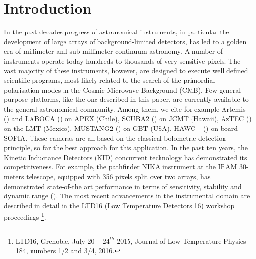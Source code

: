 \documentclass[]{aa} %
\begin{document}

   \maketitle
%

\section{Introduction}

In the past decades progress of astronomical instruments, in particular the development of large arrays of background-limited detectors, has led to a golden era of millimeter and sub-millimeter continuum astronomy. A number of instruments operate today hundreds to thousands of very sensitive pixels. The vast majority of these instruments, however, are designed to execute well defined scientific programs, most likely related to the search of the primordial polarisation modes in the Cosmic Microwave Background (CMB). Few general purpose platforms, like the one described in this paper, are currently available to the general astronomical community. Among them, we cite for example Artemis (\cite{Reveret2014}) and LABOCA (\cite{Siringo2009}) on APEX (Chile), SCUBA2 (\cite{Holland2013}) on JCMT (Hawaii), AzTEC (\cite{Chavez-Dagostino2016}) on the LMT (Mexico), MUSTANG2 (\cite{Dicker2014}) on GBT (USA), HAWC+ (\cite{Staguhn2016}) on-board SOFIA. These cameras are all based on the classical bolometric detection principle, so far the best approach for this application. In the past ten years, the Kinetic Inductance Detectors (KID) concurrent technology has demonstrated its competitiveness. For example, the pathfinder NIKA instrument at the IRAM 30-meters telescope, equipped with 356 pixels split over two arrays, has demonstrated state-of-the art performance in terms of sensitivity, stability and dynamic range (\cite{Monfardini2010, Monfardini2011, Catalano2014, Adam2014}). The most recent advancements in the instrumental domain are described in detail in the LTD16 (Low Temperature Detectors 16) workshop proceedings \footnote{LTD16, Grenoble, July $20-24^{th}$ 2015,  Journal of Low Temperature Physics 184, numbers 1/2 and 3/4, 2016.}. 

\end{document}
